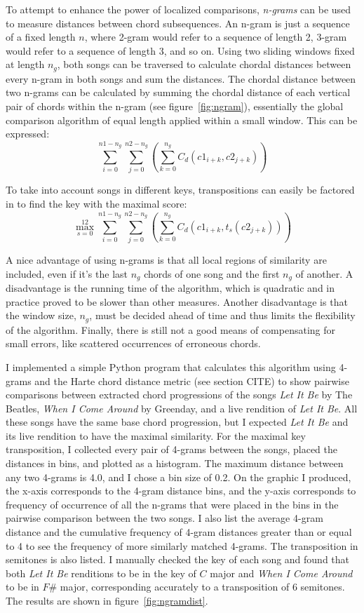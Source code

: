 To attempt to enhance the power of localized comparisons, \textit{n-grams} can be used to measure distances between chord subsequences. An n-gram is just a sequence of a fixed length $n$, where 2-gram would refer to a sequence of length 2, 3-gram would refer to a sequence of length 3, and so on. Using two sliding windows fixed at length $n_g$, both songs can be traversed to calculate chordal distances between every n-gram in both songs and sum the distances. The chordal distance between two n-grams can be calculated by summing the chordal distance of each vertical pair of chords within the n-gram (see figure~\ref{fig:ngram}), essentially the global comparison algorithm of equal length applied within a small window. This can be expressed: \[\sum_{i=0}^{n1 - n_g} \sum_{j=0}^{n2 - n_g} \left( \sum_{k=0}^{n_g} C_d({c1}_{i+k}, {c2}_{j+k}) \right) \]

To take into account songs in different keys, transpositions can easily be factored in to find the key with the maximal score: \[\max_{s=0}^{12} \sum_{i=0}^{n1 - n_g} \sum_{j=0}^{n2 - n_g} \left( \sum_{k=0}^{n_g} C_d({c1}_{i+k}, t_s({c2}_{j+k})) \right) \]

A nice advantage of using n-grams is that all local regions of similarity are included, even if it's the last $n_g$ chords of one song and the first $n_g$ of another. A disadvantage is the running time of the algorithm, which is quadratic and in practice proved to be slower than other measures. Another disadvantage is that the window size, $n_g$, must be decided ahead of time and thus limits the flexibility of the algorithm. Finally, there is still not a good means of compensating for small errors, like scattered occurrences of erroneous chords.

I implemented a simple Python program that calculates this algorithm using 4-grams and the Harte chord distance metric (see section CITE) to show pairwise comparisons between extracted chord progressions of the songs \textit{Let It Be} by The Beatles, \textit{When I Come Around} by Greenday, and a live rendition of \textit{Let It Be}. All these songs have the same base chord progression, but I expected \textit{Let It Be} and its live rendition to have the maximal similarity. For the maximal key transposition, I collected every pair of 4-grams between the songs, placed the distances in bins, and plotted as a histogram. The maximum distance between any two 4-grams is 4.0, and I chose a bin size of 0.2. On the graphic I produced, the x-axis corresponds to the 4-gram distance bins, and the y-axis corresponds to frequency of occurrence of all the n-grams that were placed in the bins in the pairwise comparison between the two songs. I also list the average 4-gram distance and the cumulative frequency of 4-gram distances greater than or equal to 4 to see the frequency of more similarly matched 4-grams. The transposition in semitones is also listed. I manually checked the key of each song and found that both \textit{Let It Be} renditions to be in the key of $C$ major and \textit{When I Come Around} to be in $F\#$ major, corresponding accurately to a transposition of $6$ semitones. The results are shown in figure~\ref{fig:ngramdist}.